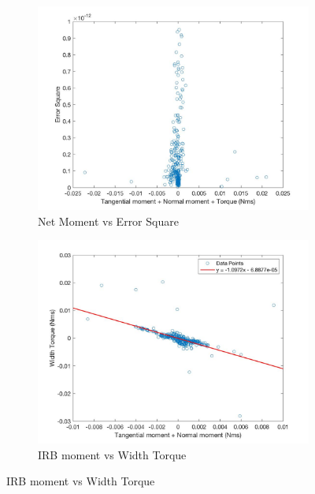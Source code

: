 \documentclass{article}
\begin{document}
\begin{figure}[h!]
     \begin{subfigure}[b]{0.45\linewidth}
            \includegraphics[scale=0.15]{SquarePlot11.jpg}
            \caption{Net Moment vs Error Square}
    \end{subfigure}
    \quad
    \begin{subfigure}[b]{0.45\linewidth}
            \includegraphics[scale=0.15]{SquarePlot22.jpg}
            \caption{IRB moment vs Width Torque}
    \end{subfigure}
\end{figure}
\end{document}
